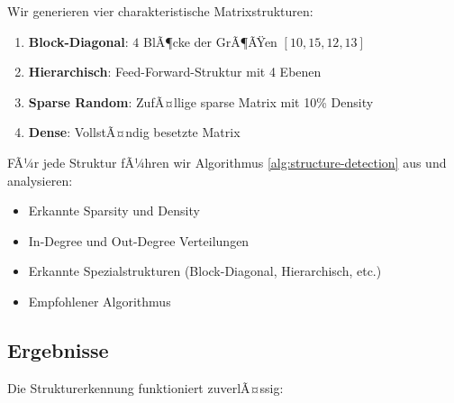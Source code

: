 ﻿\documentclass[a4paper,12pt]{report}
\theoremstyle{definition}
\begin{document}
	Wir generieren vier charakteristische Matrixstrukturen:
	
	\begin{enumerate}
		\item \textbf{Block-Diagonal}: $4$ BlÃ¶cke der GrÃ¶ÃŸen $[10, 15, 12, 13]$
		\item \textbf{Hierarchisch}: Feed-Forward-Struktur mit 4 Ebenen
		\item \textbf{Sparse Random}: ZufÃ¤llige sparse Matrix mit 10\% Density
		\item \textbf{Dense}: VollstÃ¤ndig besetzte Matrix
	\end{enumerate}
	
	FÃ¼r jede Struktur fÃ¼hren wir Algorithmus \ref{alg:structure-detection} aus und analysieren:
	\begin{itemize}
		\item Erkannte Sparsity und Density
		\item In-Degree und Out-Degree Verteilungen
		\item Erkannte Spezialstrukturen (Block-Diagonal, Hierarchisch, etc.)
		\item Empfohlener Algorithmus
	\end{itemize}
	
	\subsection{Ergebnisse}
	
	Die Strukturerkennung funktioniert zuverlÃ¤ssig:
	
\end{document}
